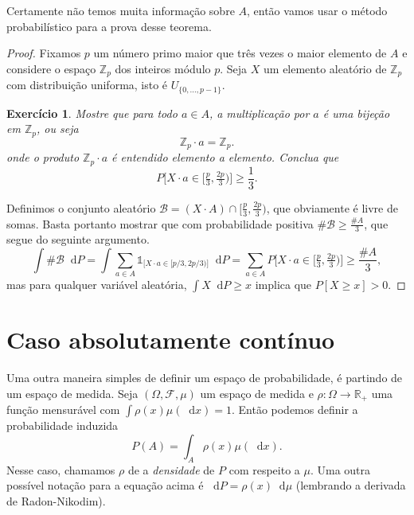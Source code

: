\documentclass[reqno, draft]{book}
\newcommand*\1{\mathds{1}}
\newtheorem{exercise}[example]{Exercício}
\renewcommand*\d{\mathop{}\!\mathrm{d}}
\begin{document}
Certamente não temos muita informação sobre $A$, então vamos usar o método probabilístico para a prova desse teorema.

\begin{proof}
  Fixamos $p$ um número primo maior que três vezes o maior elemento de $A$ e considere o espaço $\mathbb{Z}_p$ dos inteiros módulo $p$.
  Seja $X$ um elemento aleatório de $\mathbb{Z}_p$ com distribuição uniforma, isto é $U_{\{0, \dots, p-1\}}$.
  \begin{exercise}
    Mostre que para todo $a \in A$, a multiplicação por $a$ é uma bijeção em $\mathbb{Z}_p$, ou seja
    \begin{equation}
      \mathbb{Z}_p \cdot a = \mathbb{Z}_p.
    \end{equation}
    onde o produto $\mathbb{Z}_p \cdot a$ é entendido elemento a elemento.
    Conclua que
    \begin{equation}
      P \Big[ X \cdot a \in \big[\tfrac p3, \tfrac {2p}3\big) \Big] \geq \frac 13.
    \end{equation}
  \end{exercise}
  Definimos o conjunto aleatório $\mathcal{B} = (X \cdot A) \cap [\tfrac p3, \tfrac {2p}3)$, que obviamente é livre de somas.
  Basta portanto mostrar que com probabilidade positiva $\# \mathcal{B} \geq \tfrac{\#A}3$, que segue do seguinte argumento.
  \begin{equation*}
    \int \# \mathcal{B} \d P = \int \sum_{a \in A} \1_{\big[ X \cdot a \in [p/3, 2p/3) \big]} \d P = \sum_{a \in A} P \Big[ X \cdot a \in \big[\tfrac p3, \tfrac {2p}3\big) \Big] \geq \frac{\# A}3,
  \end{equation*}
  mas para qualquer variável aleatória, $\int X \d P \geq x$ implica que $P[X \geq x] > 0$.
\end{proof}





\vfill
\pagebreak


\section{Caso absolutamente contínuo}

Uma outra maneira simples de definir um espaço de probabilidade, é partindo de um espaço de medida.
Seja $(\Omega, \mathcal{F}, \mu)$ um espaço de medida e $\rho:\Omega \to \mathbb{R}_+$ uma função mensurável com $\int \rho(x) \mu(\d x) = 1$.
Então podemos definir a probabilidade induzida
\begin{equation}
  \label{e:absolutamente_cont}
  P(A) = \int_A \rho(x) \mu(\d x).
\end{equation}
Nesse caso, chamamos $\rho$ de a \emph{densidade}  de $P$ com respeito a $\mu$.
Uma outra possível notação para a equação acima é $\d P = \rho(x) \d \mu$ \index{dP@$\d P = \rho \d \mu$} (lembrando a derivada de Radon-Nikodim).
\end{document}

